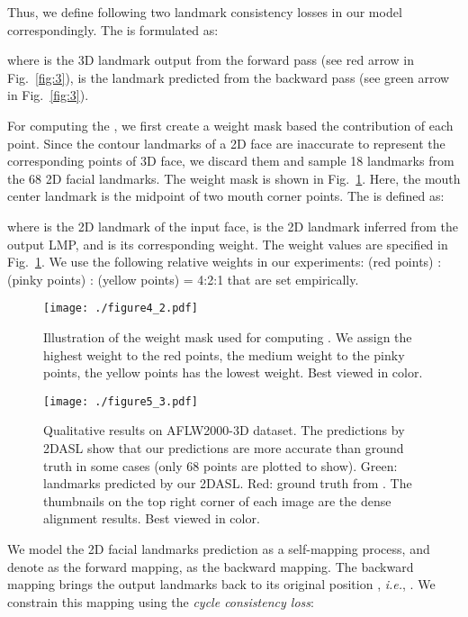 \documentclass[10pt,twocolumn,letterpaper]{article}
\begin{document}
{Thus, we define following two landmark consistency losses in our model correspondingly. The  is formulated as:

where  is the  3D landmark output from the forward pass (see red arrow in Fig.~\ref{fig:3}),  is the  landmark predicted from the backward pass (see green arrow in Fig.~\ref{fig:3}).

For computing the , we first create a weight mask  based the contribution of each point. Since the contour landmarks of a 2D face are inaccurate to represent the corresponding points of 3D face, we discard them and sample 18 landmarks from the 68 2D facial landmarks.
The weight mask is shown in Fig.~\ref{fig:4}.  Here, the mouth center landmark is the midpoint of two mouth corner points. The  is defined as:

where  is the  2D landmark of the input face,  is the  2D landmark inferred from  the output LMP, and  is its corresponding weight. The weight values are specified in Fig.~\ref{fig:4}. We use the following relative  weights  in our experiments: (red points) : (pinky points) : (yellow points) = 4:2:1 that are set empirically.
\begin{figure}[t!]
\center
\vspace{-0.1cm}
\texttt{[image: ./figure4\_2.pdf]}\vspace{-0.4cm}
\caption{{Illustration of the weight mask used for computing . We assign the highest weight to the red points, the medium weight to the pinky points, the yellow points has the lowest weight. Best viewed in color.}}
\label{fig:4}
\end{figure}

\begin{figure*}[t]
\center
\texttt{[image: ./figure5\_3.pdf]}\vspace{-0.3cm}
\caption{Qualitative results on AFLW2000-3D dataset. The predictions by 2DASL show that our predictions are more accurate than ground truth in some cases (only 68 points are plotted to show). Green: landmarks predicted by our 2DASL. Red: ground truth from \cite{zhu2016face}. The thumbnails on the top right corner of each image are the dense alignment results. Best viewed in color.}
\label{fig:5}
\end{figure*}

We model the 2D facial landmarks prediction as a self-mapping process, and denote  as the forward mapping,  as the backward mapping. The backward mapping brings the output landmarks  back to its original position , \textit{i.e.}, . We constrain this mapping using the \textit{cycle consistency loss}:

}
\end{document}
